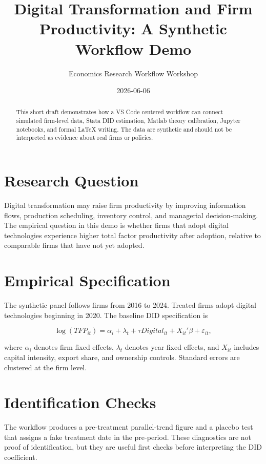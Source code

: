 \documentclass[11pt]{article}
\title{Digital Transformation and Firm Productivity: A Synthetic Workflow Demo}
\author{Economics Research Workflow Workshop}
\date{2026-06-06}
\begin{document}
\maketitle

\begin{abstract}
This short draft demonstrates how a VS Code centered workflow can connect simulated firm-level data, Stata DID estimation, Matlab theory calibration, Jupyter notebooks, and formal \LaTeX{} writing. The data are synthetic and should not be interpreted as evidence about real firms or policies.
\end{abstract}

\section{Research Question}

Digital transformation may raise firm productivity by improving information flows, production scheduling, inventory control, and managerial decision-making. The empirical question in this demo is whether firms that adopt digital technologies experience higher total factor productivity after adoption, relative to comparable firms that have not yet adopted.

\section{Empirical Specification}

The synthetic panel follows firms from 2016 to 2024. Treated firms adopt digital technologies beginning in 2020. The baseline DID specification is

\begin{equation}
\log(TFP_{it}) = \alpha_i + \lambda_t + \tau Digital_{it} + X_{it}'\beta + \varepsilon_{it},
\end{equation}

where $\alpha_i$ denotes firm fixed effects, $\lambda_t$ denotes year fixed effects, and $X_{it}$ includes capital intensity, export share, and ownership controls. Standard errors are clustered at the firm level.

\section{Identification Checks}

The workflow produces a pre-treatment parallel-trend figure and a placebo test that assigns a fake treatment date in the pre-period. These diagnostics are not proof of identification, but they are useful first checks before interpreting the DID coefficient.
\end{document}
